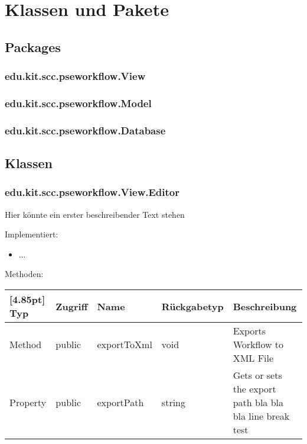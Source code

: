 \chapter{Klassen und Pakete}

    \section{Packages}
        \subsection{edu.kit.scc.pseworkflow.View}
        \subsection{edu.kit.scc.pseworkflow.Model}
        \subsection{edu.kit.scc.pseworkflow.Database}
        
    \section{Klassen}
    
        \subsection{edu.kit.scc.pseworkflow.View.Editor}
        
            Hier könnte ein erster beschreibender Text stehen
            
            Implementiert:
            \begin{itemize}
                \item ...
            \end{itemize}
            
            Methoden:
            \begin{center}
	            \setlength\tabcolsep{5pt}
	            \renewcommand{\arraystretch}{1.5}
	            
                \begin{tabularx}{\textwidth}{|l|l|l|l|X|}
                    \hline
                    \rowcolor[gray]{0.75}[4.85pt]
                    Typ & Zugriff & Name & Rückgabetyp & Beschreibung \\ \hline 
                    Method & public & exportToXml & void & Exports Workflow to XML File \\ \hline
                    Property & public & exportPath & string & Gets or sets the export path bla bla bla line break test\\
                    \hline
                \end{tabularx}
            \end{center}
                
